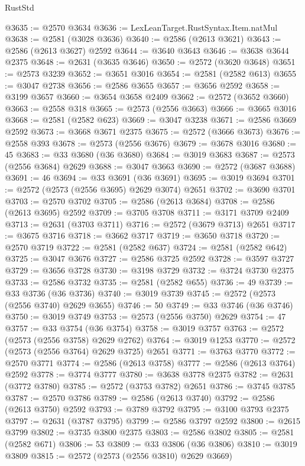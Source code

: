 \begin{lexlean}{RustStd}
\begin{coremodule}
@3635 := @2570 @3634
@3636 := LexLeanTarget.RustSyntax.Item.natMul
@3638 := @2581 (@3028 @3636)
@3640 := @2586 (@2613 @3621)
@3643 := @2586 (@2613 @3627) @2592
@3644 := @3640 @3643
@3646 := @3638 @3644 @2375
@3648 := @2631 (@3635 @3646)
@3650 := @2572 (@3620 @3648)
@3651 := @2573 @3239
@3652 := @3651 @3016
@3654 := @2581 (@2582 @613)
@3655 := @3047 @2738
@3656 := @2586 @3655
@3657 := @3656 @2592
@3658 := @3199 @3657
@3660 := @3654 @3658 @2409
@3662 := @2572 (@3652 @3660)
@3663 := @2558 @318
@3665 := @2573 (@2556 @3663)
@3666 := @3665 @3016
@3668 := @2581 (@2582 @623)
@3669 := @3047 @3238
@3671 := @2586 @3669 @2592
@3673 := @3668 @3671 @2375
@3675 := @2572 (@3666 @3673)
@3676 := @2558 @393
@3678 := @2573 (@2556 @3676)
@3679 := @3678 @3016
@3680 := 45
@3683 := @33 @3680 (@36 @3680)
@3684 := @3019 @3683
@3687 := @2573 (@2556 @3684) @2629
@3688 := @3047 @3663
@3690 := @2572 (@3687 @3688)
@3691 := 46
@3694 := @33 @3691 (@36 @3691)
@3695 := @3019 @3694
@3701 := @2572 (@2573 (@2556 @3695) @2629 @3074) @2651
@3702 := @3690 @3701
@3703 := @2570 @3702
@3705 := @2586 (@2613 @3684)
@3708 := @2586 (@2613 @3695) @2592
@3709 := @3705 @3708
@3711 := @3171 @3709 @2409
@3713 := @2631 (@3703 @3711)
@3716 := @2572 (@3679 @3713) @2651
@3717 := @3675 @3716
@3718 := @3662 @3717
@3719 := @3650 @3718
@3720 := @2570 @3719
@3722 := @2581 (@2582 @637)
@3724 := @2581 (@2582 @642)
@3725 := @3047 @3676
@3727 := @2586 @3725 @2592
@3728 := @3597 @3727
@3729 := @3656 @3728
@3730 := @3198 @3729
@3732 := @3724 @3730 @2375
@3733 := @2586 @3732
@3735 := @2581 (@2582 @655)
@3736 := 49
@3739 := @33 @3736 (@36 @3736)
@3740 := @3019 @3739
@3745 := @2572 (@2573 (@2556 @3740) @2629 @3655)
@3746 := 50
@3749 := @33 @3746 (@36 @3746)
@3750 := @3019 @3749
@3753 := @2573 (@2556 @3750) @2629
@3754 := 47
@3757 := @33 @3754 (@36 @3754)
@3758 := @3019 @3757
@3763 := @2572 (@2573 (@2556 @3758) @2629 @2762)
@3764 := @3019 @1253
@3770 := @2572 (@2573 (@2556 @3764) @2629 @3725) @2651
@3771 := @3763 @3770
@3772 := @2570 @3771
@3774 := @2586 (@2613 @3758)
@3777 := @2586 (@2613 @3764) @2592
@3778 := @3774 @3777
@3780 := @3638 @3778 @2375
@3782 := @2631 (@3772 @3780)
@3785 := @2572 (@3753 @3782) @2651
@3786 := @3745 @3785
@3787 := @2570 @3786
@3789 := @2586 (@2613 @3740)
@3792 := @2586 (@2613 @3750) @2592
@3793 := @3789 @3792
@3795 := @3100 @3793 @2375
@3797 := @2631 (@3787 @3795)
@3799 := @2586 @3797 @2592
@3800 := @2615 @3799
@3802 := @3735 @3800 @2375
@3803 := @2586 @3802
@3805 := @2581 (@2582 @671)
@3806 := 53
@3809 := @33 @3806 (@36 @3806)
@3810 := @3019 @3809
@3815 := @2572 (@2573 (@2556 @3810) @2629 @3669)

\end{coremodule}
\end{lexlean}
